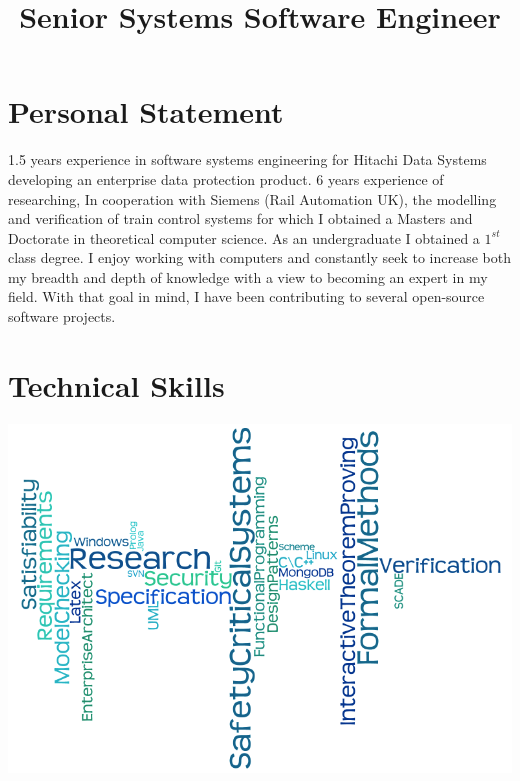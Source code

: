 \documentclass[11pt,a4paper,sans]{moderncv}
\title{Senior Systems Software Engineer}
\begin{document}
\makecvtitle

\section{Personal Statement}
1.5 years experience in software systems engineering for Hitachi Data Systems developing an enterprise data protection product. 6 years experience of researching, In cooperation with Siemens (Rail Automation UK), the modelling and verification of train control systems for which I obtained a Masters and Doctorate in theoretical computer science. As an undergraduate I obtained a $1^{st}$ class degree.  I enjoy working with computers and constantly seek to increase both my breadth and depth of knowledge with a view to becoming an expert in my field. With that goal in mind, I have been contributing to several open-source software projects.
\section{Technical Skills}
\begin{center}
\includegraphics[scale = 0.5]{wordle}
\end{center}
\newpage
\end{document}
